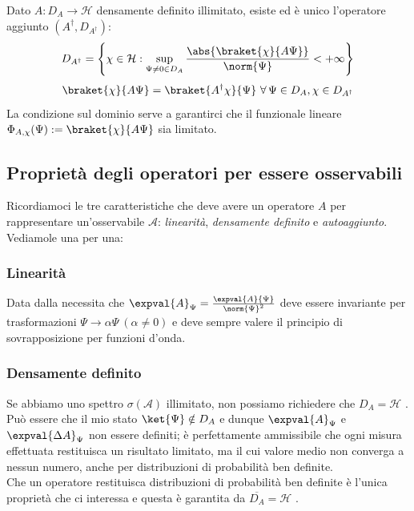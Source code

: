 \begin{definition}
    Dato \(A: D_A \to \mathcal{H}\) densamente definito illimitato, 
    esiste ed è unico l'operatore aggiunto \((A^\dagger, D_{A^\dagger})\):
    \begin{equation*}
        D_{A^\dagger} = \left\{ \chi \in \mathcal{H} :\sup_{\Psi \neq 0  \in D_A} \frac{\abs{\braket{\chi}{A\Psi}}}{\norm{\Psi}}<+\infty\right\}
    \end{equation*} 
    \begin{equation}
        \braket{\chi}{A\Psi} = \braket{A^\dagger \chi}{\Psi} \ \forall\, \Psi \in D_A, \chi \in D_{A^\dagger}
    \end{equation}
    La condizione sul dominio serve a garantirci che il funzionale lineare \(\Phi_{A,\chi}(\Psi):= \braket{\chi}{A\Psi}\) sia limitato.
\end{definition}


\subsection{Proprietà degli operatori per essere osservabili}
Ricordiamoci le tre caratteristiche che deve avere un operatore \(A\) per rappresentare un'osservabile \(\mathcal{A}\): 
\textit{linearità}, \textit{densamente definito} e \textit{autoaggiunto}. Vediamole una per una:

\subsubsection{Linearità}
Data dalla necessita che \(\expval{A}_{\Psi}= \frac{\expval{A}{\Psi}}{\norm{\Psi}^2}\) 
deve essere invariante per trasformazioni \(\Psi\to \alpha \Psi\ (\alpha\neq 0)\) e deve sempre valere il principio di sovrapposizione per funzioni d'onda.

\subsubsection{Densamente definito}

Se abbiamo uno spettro \(\sigma(\mathcal{A})\) illimitato, non possiamo richiedere che \(D_A = \mathcal{H}\) .\\
Può essere che il mio stato \(\ket{\Psi} \notin D_A\) e dunque \(\expval{A}_{\Psi}\) e \(\expval{\Delta A}_{\Psi}\) non essere definiti; 
è perfettamente ammissibile che ogni misura effettuata restituisca un risultato limitato, ma il cui valore medio non converga a nessun numero,
anche per distribuzioni di probabilità ben definite.\\
Che un operatore restituisca distribuzioni di probabilità ben definite è l'unica proprietà che ci interessa e questa è garantita da \(\overline{D_A}= \mathcal{H}\) .

